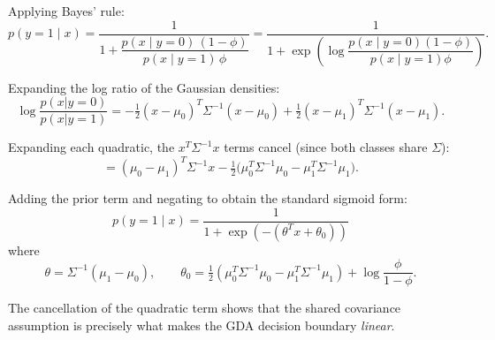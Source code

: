 \begin{answer}
Applying Bayes' rule:
\[
p(y=1 \mid x) = \frac{1}{1 + \dfrac{p(x\mid y=0)\,(1-\phi)}{p(x\mid y=1)\,\phi}}
= \frac{1}{1 + \exp\!\left(\log\dfrac{p(x\mid y=0)(1-\phi)}{p(x\mid y=1)\phi}\right)}.
\]

Expanding the log ratio of the Gaussian densities:
\[
\log\frac{p(x|y=0)}{p(x|y=1)}
= -\tfrac{1}{2}(x-\mu_0)^T\Sigma^{-1}(x-\mu_0)
  +\tfrac{1}{2}(x-\mu_1)^T\Sigma^{-1}(x-\mu_1).
\]

Expanding each quadratic, the $x^T\Sigma^{-1}x$ terms cancel (since both classes share $\Sigma$):
\[
= (\mu_0 - \mu_1)^T\Sigma^{-1}x
  - \tfrac{1}{2}\bigl(\mu_0^T\Sigma^{-1}\mu_0 - \mu_1^T\Sigma^{-1}\mu_1\bigr).
\]

Adding the prior term and negating to obtain the standard sigmoid form:
\[
\boxed{p(y=1\mid x) = \frac{1}{1+\exp(-(\theta^T x + \theta_0))}}
\]
where
\[
\theta = \Sigma^{-1}(\mu_1 - \mu_0), \qquad
\theta_0 = \tfrac{1}{2}(\mu_0^T\Sigma^{-1}\mu_0 - \mu_1^T\Sigma^{-1}\mu_1)
           + \log\frac{\phi}{1-\phi}.
\]

The cancellation of the quadratic term shows that the shared covariance assumption is precisely what makes the GDA decision boundary \emph{linear}.
\end{answer}
